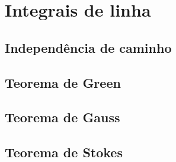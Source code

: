 \chapter{Integrais de linha}

\section{Independência de caminho}

\section{Teorema de Green}

\section{Teorema de Gauss}

\section{Teorema de Stokes}